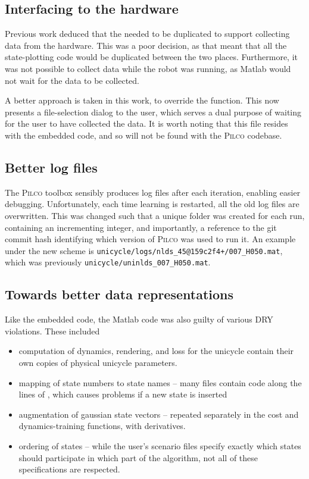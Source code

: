 \documentclass[main.tex]{subfiles}
\begin{document}
\subsection{Interfacing to the hardware}

Previous work deduced that the  needed to be duplicated to support collecting data from the hardware.
This was a poor decision, as that meant that all the state-plotting code would be duplicated between the two places.
Furthermore, it was not possible to collect data while the robot was running, as Matlab would not wait for the data to be collected.

A better approach is taken in this work, to override the  function.
This now presents a file-selection dialog to the user, which serves a dual purpose of waiting for the user to have collected the data.
It is worth noting that this file resides with the embedded code, and so will not be found with the \textsc{Pilco} codebase.

\subsection{Better log files}

The \textsc{Pilco} toolbox sensibly produces log files after each iteration, enabling easier debugging.
Unfortunately, each time learning is restarted, all the old log files are overwritten.
This was changed such that a unique folder was created for each run, containing an incrementing integer, and importantly, a reference to the git commit hash identifying which version of \textsc{Pilco} was used to run it. An example under the new scheme is \lstinline{unicycle/logs/nlds_45@159c2f4+/007_H050.mat}, which was previously \lstinline{unicycle/uninlds_007_H050.mat}.

\subsection{Towards better data representations}

	Like the embedded code, the Matlab code was also guilty of various DRY violations.
	These included
	\begin{itemize}[noitemsep]
		\item computation of dynamics, rendering, and loss for the unicycle contain their own copies of physical unicycle parameters.
		\item mapping of state numbers to state names -- many files contain code along the lines of , which causes problems if a new state is inserted
		\item augmentation of gaussian state vectors -- repeated separately in the cost and dynamics-training functions, with derivatives.
		\item ordering of states -- while the user's scenario files specify exactly which states should participate in which part of the algorithm, not all of these specifications are respected.
	\end{itemize}
\end{document}
